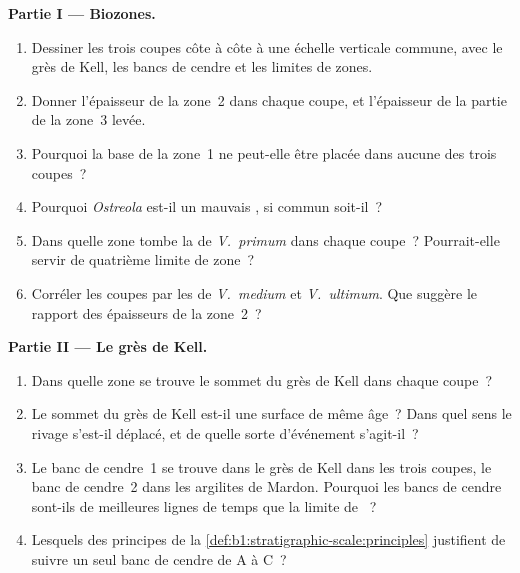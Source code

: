 \begin{problem}
\medskip
\noindent\textbf{Partie I --- Biozones.}
\begin{enumerate}
  \item Dessiner les trois coupes côte à côte à une échelle verticale commune, avec
        le grès de Kell, les bancs de cendre et les limites de zones.
  \item Donner l'épaisseur de la zone~2 dans chaque coupe, et l'épaisseur de la
        partie de la zone~3 levée.
  \item Pourquoi la base de la zone~1 ne peut-elle être placée dans aucune des trois coupes~?
  \item Pourquoi \emph{Ostreola} est-il un mauvais , si commun soit-il~?
  \item Dans quelle zone tombe la  de \emph{V.~primum} dans chaque
        coupe~? Pourrait-elle servir de quatrième limite de zone~?
  \item Corréler les coupes par les  de \emph{V.~medium} et
        \emph{V.~ultimum}. Que suggère le rapport des épaisseurs de la zone~2~?
\end{enumerate}

\noindent\textbf{Partie II --- Le grès de Kell.}
\begin{enumerate}[resume]
  \item Dans quelle zone se trouve le sommet du grès de Kell dans chaque coupe~?
  \item Le sommet du grès de Kell est-il une surface de même âge~? Dans quel sens
        le rivage s'est-il déplacé, et de quelle sorte d'événement s'agit-il~?
  \item Le banc de cendre~1 se trouve dans le grès de Kell dans les trois coupes, le banc de cendre~2 dans
        les argilites de Mardon. Pourquoi les bancs de cendre sont-ils de meilleures lignes de temps que
        la limite de ~?
  \item Lesquels des principes de la
        \cref{def:b1:stratigraphic-scale:principles} justifient de suivre un seul
        banc de cendre de A à C~?
\end{enumerate}


\end{problem}
